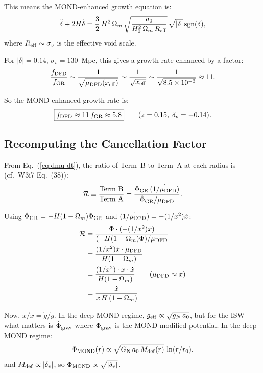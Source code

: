 \documentclass[11pt,a4paper]{article}
\newcommand{\Hzero}{H_0}
\newcommand{\aM}{a_0}
\newcommand{\mufd}{\mu_{\rm DFD}}
\newcommand{\GN}{G_{\rm N}}
\newcommand{\ee}[1]{\times 10^{#1}}
\newcommand{\Omm}{\Omega_m}
\begin{document}
\begin{tcolorbox}[colback=red!5!white, colframe=red!60!black,
  title=\textbf{Key Correction: MOND-Enhanced Void Growth}]
This means the MOND-enhanced growth equation is:
\begin{equation}
\ddot{\delta} + 2H\dot{\delta}
= \frac{3}{2}\,H^2\,\Omm\,\sqrt{\frac{\aM}{\Hzero^2\,\Omm\,R_{\rm eff}}}
\,\sqrt{|\delta|}\,\text{sgn}(\delta),
\label{eq:growth-sqrt}
\end{equation}
where $R_{\rm eff} \sim \sigma_v$ is the effective void scale.

For $|\delta| = 0.14$, $\sigma_v = 130$~Mpc, this gives a growth
rate enhanced by a factor:
\begin{equation}
\frac{f_{\rm DFD}}{f_{\rm GR}}
\sim \frac{1}{\sqrt{\mufd(x_{\rm eff})}}
\sim \frac{1}{\sqrt{x_{\rm eff}}}
\sim \frac{1}{\sqrt{8.5\ee{-3}}}
\approx 11.
\label{eq:f-enhancement}
\end{equation}

So the MOND-enhanced growth rate is:
\begin{equation}
\boxed{f_{\rm DFD} \approx 11\,f_{\rm GR} \approx 5.8}
\qquad (z = 0.15,\;\delta_v = -0.14).
\label{eq:f-DFD}
\end{equation}

\end{tcolorbox}


\subsection{Recomputing the Cancellation Factor}
\label{sec:cancel-recompute}

From Eq.~(\ref{eq:dmu-dt}), the ratio of Term~B to Term~A at each
radius is (cf.\ W3i7 Eq.~(38)):
\begin{equation}
\mathcal{R} \equiv \frac{\text{Term B}}{\text{Term A}}
= \frac{\Phi_{\rm GR}\,\dot{(1/\mufd)}}{\dot{\Phi}_{\rm GR}/\mufd}.
\label{eq:ratio-def}
\end{equation}

Using $\dot{\Phi}_{\rm GR} = -H(1-\Omm)\Phi_{\rm GR}$ and
$\dot{(1/\mufd)} = -(1/x^2)\dot{x}$:
\begin{align}
\mathcal{R}
&= \frac{\Phi\cdot(-(1/x^2)\dot{x})}{(-H(1-\Omm)\Phi)/\mufd}
\nonumber\\
&= \frac{(1/x^2)\dot{x}\cdot\mufd}{H(1-\Omm)}
\nonumber\\
&= \frac{(1/x^2)\cdot x\cdot\dot{x}}{H(1-\Omm)}
\qquad (\mufd \approx x)
\nonumber\\
&= \frac{\dot{x}}{x\,H\,(1-\Omm)}.
\label{eq:ratio-calc}
\end{align}

Now, $\dot{x}/x = \dot{g}/g$. In the deep-MOND regime,
$g_{\rm eff} \propto \sqrt{g_N\,\aM}$, but for the ISW what matters
is $\dot{\Phi}_{\rm grav}$ where $\Phi_{\rm grav}$ is the MOND-modified
potential. In the deep-MOND regime:
\begin{equation}
\Phi_{\rm MOND}(r) \propto \sqrt{\GN\,\aM\,M_{\rm def}(r)}\,\ln(r/r_0),
\end{equation}
and $M_{\rm def} \propto |\delta_v|$, so $\Phi_{\rm MOND} \propto
\sqrt{|\delta_v|}$.
\end{document}
